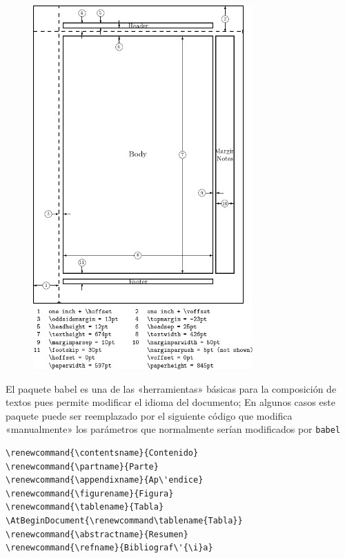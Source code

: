 \documentclass[a4,11pt]{aleph-notas-alpha}
\begin{document}
\begin{figure}[H]
    \centering
    \includegraphics[width=0.75\textwidth]{Imagenes/Layout-dimensions.png}
\end{figure}

\newpage


El paquete babel es una de las «herramientas» básicas para la composición de textos pues permite modificar el idioma del documento; En algunos casos este paquete puede ser reemplazado por el siguiente código que modifica «manualmente» los parámetros que normalmente serían modificados por \texttt{babel}

\begin{tcbcodigo} \begin{lstlisting}
\renewcommand{\contentsname}{Contenido}
\renewcommand{\partname}{Parte}
\renewcommand{\appendixname}{Ap\'endice}
\renewcommand{\figurename}{Figura}
\renewcommand{\tablename}{Tabla}
\AtBeginDocument{\renewcommand\tablename{Tabla}}
\renewcommand{\abstractname}{Resumen}
\renewcommand{\refname}{Bibliograf\'{\i}a}
\end{lstlisting} \end{tcbcodigo}
\end{document}
